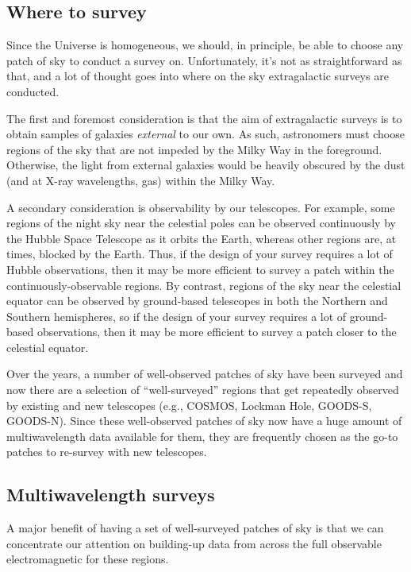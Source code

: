 \documentclass[11pt]{article}
\begin{document}
\subsection{Where to survey}
Since the Universe is homogeneous, we should, in principle, be able to
choose any patch of sky to conduct a survey on. Unfortunately, it's
not as straightforward as that, and a lot of thought goes into where
on the sky extragalactic surveys are conducted.

The first and foremost consideration is that the aim of extragalactic
surveys is to obtain samples of galaxies {\it external} to our own. As
such, astronomers must choose regions of the sky that are not impeded
by the Milky Way in the foreground. Otherwise, the light from external
galaxies would be heavily obscured by the dust (and at X-ray
wavelengths, gas) within the Milky Way.

A secondary consideration is observability by our telescopes. For
example, some regions of the night sky near the celestial poles can be
observed continuously by the Hubble Space Telescope as it orbits the
Earth, whereas other regions are, at times, blocked by the
Earth. Thus, if the design of your survey requires a lot of Hubble
observations, then it may be more efficient to survey a patch within
the continuously-observable regions. By contrast, regions of the sky
near the celestial equator can be observed by ground-based telescopes
in both the Northern and Southern hemispheres, so if the design of
your survey requires a lot of ground-based observations, then it may
be more efficient to survey a patch closer to the celestial equator.

Over the years, a number of well-observed patches of sky have been
surveyed and now there are a selection of ``well-surveyed'' regions
that get repeatedly observed by existing and new telescopes (e.g.,
COSMOS, Lockman Hole, GOODS-S, GOODS-N). Since these well-observed
patches of sky now have a huge amount of multiwavelength data
available for them, they are frequently chosen as the go-to patches to
re-survey with new telescopes.

\subsection{Multiwavelength surveys}
A major benefit of having a set of well-surveyed patches of sky is
that we can concentrate our attention on building-up data from across
the full observable electromagnetic for these regions.
\end{document}
